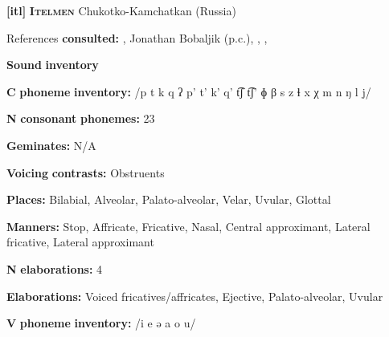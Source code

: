 \begin{styleBody}
\textbf{[itl]}   \textbf{\textsc{Itelmen}}  Chukotko-Kamchatkan (Russia)
\end{styleBody}

\begin{styleBody}
References \textbf{consulted:} \citet{Bobaljik2006}, Jonathan Bobaljik (p.c.), \citet{GeorgVolodin1999}, \citet{Volodin1976}, \citet{VolodinZhukova1968}
\end{styleBody}

\begin{styleBody}
\textbf{Sound} \textbf{inventory}
\end{styleBody}

\begin{styleBody}
\textbf{C} \textbf{phoneme} \textbf{inventory:} /p t k q ʔ p’ t’ k’ q’ t͡ʃ t͡ʃ’ ɸ β s z ɬ x χ m n ŋ l j/
\end{styleBody}

\begin{styleBody}
\textbf{N} \textbf{consonant} \textbf{phonemes:} 23
\end{styleBody}

\begin{styleBody}
\textbf{Geminates:} N/A
\end{styleBody}

\begin{styleBody}
\textbf{Voicing} \textbf{contrasts:} Obstruents
\end{styleBody}

\begin{styleBody}
\textbf{Places:} Bilabial, Alveolar, Palato-alveolar, Velar, Uvular, Glottal
\end{styleBody}

\begin{styleBody}
\textbf{Manners:} Stop, Affricate, Fricative, Nasal, Central approximant, Lateral fricative, Lateral approximant
\end{styleBody}

\begin{styleBody}
\textbf{N} \textbf{elaborations:} 4
\end{styleBody}

\begin{styleBody}
\textbf{Elaborations:} Voiced fricatives/affricates, Ejective, Palato-alveolar, Uvular
\end{styleBody}

\begin{styleBody}
\textbf{V} \textbf{phoneme} \textbf{inventory:} /i e ə a o u/
\end{styleBody}

